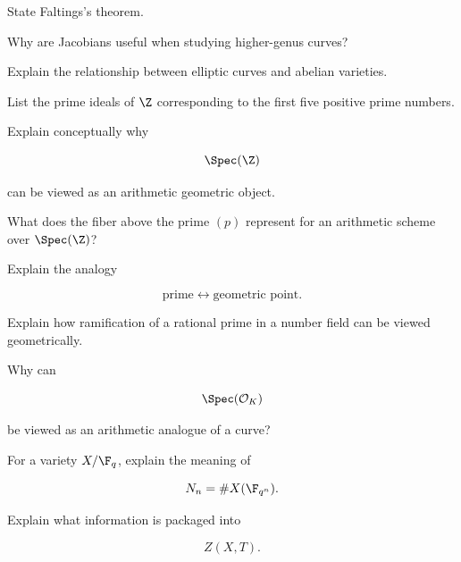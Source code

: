 \begin{exercise}[2]
State Faltings's theorem.
\end{exercise}

\begin{exercise}[2]
Why are Jacobians useful when studying higher-genus curves?
\end{exercise}

\begin{exercise}[2]
Explain the relationship between elliptic curves and abelian varieties.
\end{exercise}

\begin{exercise}[1]
List the prime ideals of \(\Z\) corresponding to the first five positive
prime numbers.
\end{exercise}

\begin{exercise}[2]
Explain conceptually why

\[ \Spec(\Z) \]

can be viewed as an arithmetic geometric object.
\end{exercise}

\begin{exercise}[2]
What does the fiber above the prime \((p)\) represent for an arithmetic
scheme over \(\Spec(\Z)\)?
\end{exercise}

\begin{exercise}[2]
Explain the analogy

\[
\text{prime}
\longleftrightarrow
\text{geometric point}.
\]
\end{exercise}

\begin{exercise}[2]
Explain how ramification of a rational prime in a number field can be viewed
geometrically.
\end{exercise}

\begin{exercise}[2]
Why can

\[ \Spec(\mathcal O_K) \]

be viewed as an arithmetic analogue of a curve?
\end{exercise}

\begin{exercise}[2]
For a variety \(X/\F_q\), explain the meaning of

\[ N_n=\#X(\F_{q^n}). \]
\end{exercise}

\begin{exercise}[2]
Explain what information is packaged into

\[ Z(X,T). \]
\end{exercise}

